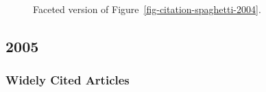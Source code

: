 \documentclass[
  10pt,
  letterpaper,
  DIV=11,
  numbers=noendperiod,
  twoside]{scrartcl}
\begin{document}
\begin{figure}


\caption{\label{fig-citation-facet-2004}Faceted version of
Figure~\ref{fig-citation-spaghetti-2004}.}

\end{figure}%

\newpage

\subsection{2005}\label{sec-s2005}

\subsubsection*{Widely Cited Articles}\label{widely-cited-articles-49}
\end{document}
